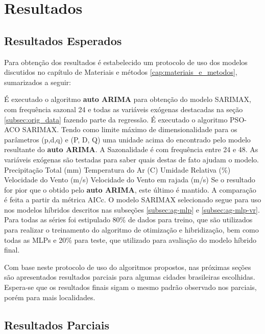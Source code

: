 \chapter{Resultados}
\label{cap:resultados}

\section{Resultados Esperados}
\label{sec:protocolo_resultados}

Para obtenção dos resultados é estabelecido um protocolo de uso dos modelos discutidos no capítulo de Materiais e métodos \ref{cap:materiais_e_metodos}, sumarizados a seguir:

\begin{outline}[enumerate]
    \1 É executado o algoritmo \textbf{auto ARIMA} para obtenção do modelo SARIMAX, com frequência sazonal 24 e todas as variáveis exógenas destacadas na seção \ref{subsec:orig_data} fazendo parte da regressão.
    \1 É executado o algoritmo PSO-ACO SARIMAX.
        \2 Tendo como limite máximo de dimensionalidade para os parâmetros (p,d,q) e (P, D, Q) uma unidade acima do encontrado pelo modelo resultante do \textbf{auto ARIMA}.
        \2 A Sazonalidade é com frequência entre 24 e 48.
        \2 As variáveis exógenas são testadas para saber quais destas de fato ajudam o modelo.
            \3 Precipitação Total (mm)
            \3 Temperatura do Ar (\textdegree{}C)
            \3 Umidade Relativa (\%)
            \3 Velocidade do Vento (m/s)
            \3 Velocidade do Vento em rajada (m/s)
        \2 Se o resultado for pior que o obtido pelo \textbf{auto ARIMA}, este último é mantido. A comparação é feita a partir da métrica AICc.
    \1 O modelo SARIMAX selecionado segue para uso nos modelos híbridos descritos nas subseções \ref{subsec:ag-mlp} e \ref{subsec:ag-mlp-vr}.
        \2 Para todas as séries foi estipulado 80\% de dados para treino, que são utilizados para realizar o treinamento do algoritmo de otimização e hibridização, bem como todas as MLPs e 20\% para teste, que utilizado para avaliação do modelo híbrido final.
\end{outline}

Com base neste protocolo de uso do algoritmos propostos, nas próximas seções são apresentados resultados parciais para algumas cidades brasileiras escolhidas. Espera-se que os resultados finais sigam o mesmo padrão observado nos parciais, porém para mais localidades.

\section{Resultados Parciais}

